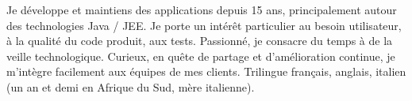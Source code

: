 

\begin{cvparagraph}

Je développe et maintiens des applications depuis 15 ans, principalement autour des technologies Java / JEE. Je porte un intérêt particulier au besoin utilisateur, à la qualité du code produit, aux tests. Passionné, je consacre du temps à de la veille technologique. Curieux, en quête de partage et d'amélioration continue, je m'intègre facilement aux équipes de mes clients. Trilingue français, anglais, italien (un an et demi en Afrique du Sud, mère italienne).
\end{cvparagraph}

